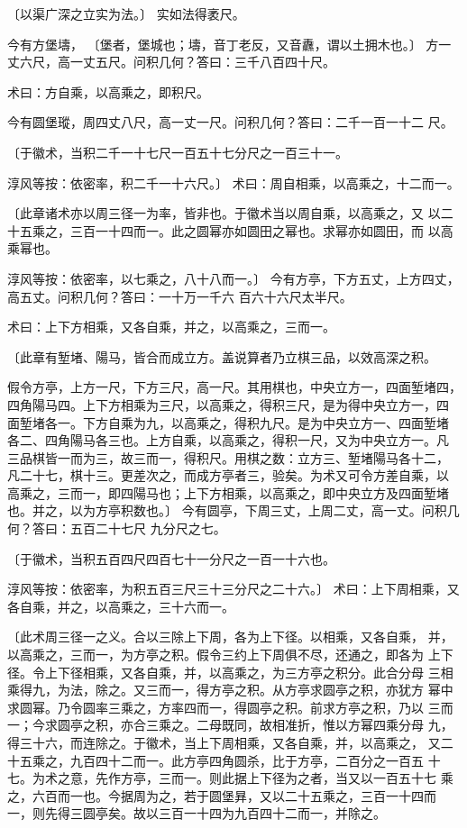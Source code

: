 \documentclass[a4paper,12pt,UTF8,twoside]{ctexbook}
\begin{document}
〔以渠广深之立实为法。〕 实如法得袤尺。

今有方堡壔， 〔堡者，堡城也；壔，音丁老反，又音纛，谓以土拥木也。〕 方一丈六尺，高一丈五尺。问积几何？答曰：三千八百四十尺。

术曰：方自乘，以高乘之，即积尺。

今有圆堡瑽，周四丈八尺，高一丈一尺。问积几何？答曰：二千一百一十二 尺。

〔于徽术，当积二千一十七尺一百五十七分尺之一百三十一。

淳风等按：依密率，积二千一十六尺。〕 术曰：周自相乘，以高乘之，十二而一。

〔此章诸术亦以周三径一为率，皆非也。于徽术当以周自乘，以高乘之，又 以二十五乘之，三百一十四而一。此之圆幂亦如圆田之幂也。求幂亦如圆田，而 以高乘幂也。

淳风等按：依密率，以七乘之，八十八而一。〕 今有方亭，下方五丈，上方四丈，高五丈。问积几何？答曰：一十万一千六 百六十六尺太半尺。

术曰：上下方相乘，又各自乘，并之，以高乘之，三而一。

〔此章有堑堵、陽马，皆合而成立方。盖说算者乃立棋三品，以效高深之积。

假令方亭，上方一尺，下方三尺，高一尺。其用棋也，中央立方一，四面堑堵四， 四角陽马四。上下方相乘为三尺，以高乘之，得积三尺，是为得中央立方一，四 面堑堵各一。下方自乘为九，以高乘之，得积九尺。是为中央立方一、四面堑堵 各二、四角陽马各三也。上方自乘，以高乘之，得积一尺，又为中央立方一。凡 三品棋皆一而为三，故三而一，得积尺。用棋之数：立方三、堑堵陽马各十二， 凡二十七，棋十三。更差次之，而成方亭者三，验矣。为术又可令方差自乘，以 高乘之，三而一，即四陽马也；上下方相乘，以高乘之，即中央立方及四面堑堵 也。并之，以为方亭积数也。〕 今有圆亭，下周三丈，上周二丈，高一丈。问积几何？答曰：五百二十七尺 九分尺之七。

〔于徽术，当积五百四尺四百七十一分尺之一百一十六也。

淳风等按：依密率，为积五百三尺三十三分尺之二十六。〕 术曰：上下周相乘，又各自乘，并之，以高乘之，三十六而一。

〔此术周三径一之义。合以三除上下周，各为上下径。以相乘，又各自乘， 并，以高乘之，三而一，为方亭之积。假令三约上下周俱不尽，还通之，即各为 上下径。令上下径相乘，又各自乘，并，以高乘之，为三方亭之积分。此合分母 三相乘得九，为法，除之。又三而一，得方亭之积。从方亭求圆亭之积，亦犹方 幂中求圆幂。乃令圆率三乘之，方率四而一，得圆亭之积。前求方亭之积，乃以 三而一；今求圆亭之积，亦合三乘之。二母既同，故相准折，惟以方幂四乘分母 九，得三十六，而连除之。于徽术，当上下周相乘，又各自乘，并，以高乘之， 又二十五乘之，九百四十二而一。此方亭四角圆杀，比于方亭，二百分之一百五 十七。为术之意，先作方亭，三而一。则此据上下径为之者，当又以一百五十七 乘之，六百而一也。今据周为之，若于圆堡昪，又以二十五乘之，三百一十四而 一，则先得三圆亭矣。故以三百一十四为九百四十二而一，并除之。
\end{document}

